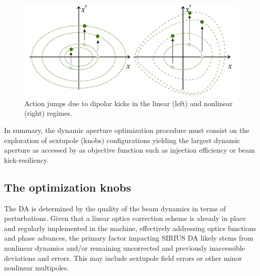 \begin{figure}
    \centering
    \includegraphics[width=\textwidth]{Images/phase_space_kick.pdf}
    \caption[Action jumps due to dipolar kicks in the linear and nonlinear regimes.]{Action jumps due to dipolar kicks in the linear (left) and nonlinear (right) regimes.}
    \label{fig:action_jump}
\end{figure}


In summary, the dynamic aperture optimization procedure must consist on the exploration of sextupole (knobs) configurations yielding the largest dynamic aperture as accessed by as objective function such as injection efficiency or beam kick-resiliency.

\subsection{The optimization knobs}
\label{subsec:knobs}
The DA is determined by the quality of the beam dynamics in terms of perturbations. Given that a linear optics correction scheme is already in place and regularly implemented in the machine, effectively addressing optics functions and phase advances, the primary factor impacting SIRIUS DA likely stems from nonlinear dynamics and/or remaining uncorrected and previously inaccessible deviations and errors. This may include sextupole field errors or other minor nonlinear multipoles.

